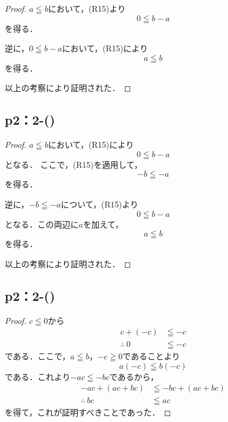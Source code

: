 \documentclass[a4paper,10pt,fleqn]{ltjsarticle}
\begin{document}
\begin{leftbar}
    \begin{proof}
        $a \leqq b$において，(R15)より
        \[
            0 \leqq b-a
        \]
        を得る．

        逆に，$0 \leqq b-a$において，(R15)により
        \[
            a \leqq b
        \]
        を得る．

        以上の考察により証明された．
    \end{proof}
\end{leftbar}

\subsection*{p2：2-()}

\begin{leftbar}
    \begin{proof}
        $a \leqq b$において，(R15)により
        \[
            0 \leqq b-a
        \]
        となる．
        ここで，(R15)を適用して，
        \[
            -b \leqq -a
        \]
        を得る．

        逆に，$-b\leqq -a$について，(R15)より
        \[
            0 \leqq b -a
        \]
        となる．この両辺に$a$を加えて，
        \[
            a \leqq b
        \]
        を得る．

        以上の考察により証明された．
    \end{proof}
\end{leftbar}

\newpage

\subsection*{p2：2-()}

\begin{leftbar}
    \begin{proof}
        $c \leqq 0$から
        \begin{align*}
            c+(-c)         & \leqq -c \\
            \therefore ~ 0 & \leqq -c
        \end{align*}
        である．ここで，$a \leqq b$，$-c \geqq 0$であることより
        \[
            a(-c) \leqq b (-c)
        \]
        である．これより$ -ac \leqq -bc$であるから，
        \begin{align*}
            -ac + (ac+bc)   & \leqq -bc +(ac+bc) \\
            \therefore ~ bc & \leqq ac
        \end{align*}
        を得て，これが証明すべきことであった．
    \end{proof}
\end{leftbar}
\end{document}
